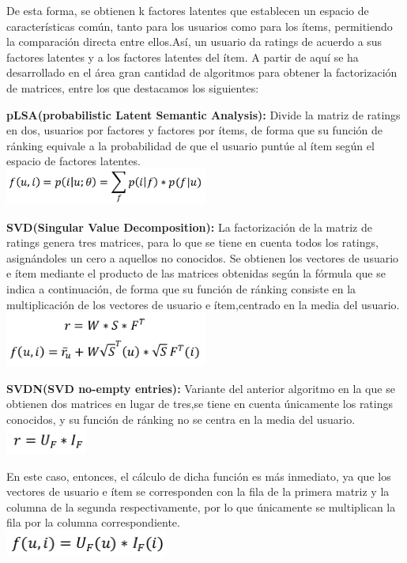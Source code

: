  		De esta forma, se obtienen k factores latentes que establecen un espacio de características común, tanto para los usuarios como para los ítems, permitiendo la comparación directa entre ellos.Así, un usuario da ratings de acuerdo a sus factores latentes y a los factores latentes del ítem.
 		A partir de aquí se ha desarrollado en el área gran cantidad de algoritmos para obtener la factorización de matrices, entre los que destacamos los siguientes:

 		\textbf{pLSA(probabilistic Latent Semantic Analysis):} Divide la matriz de ratings en dos, usuarios por factores y factores por ítems, de forma que su función de ránking equivale a la probabilidad de que el usuario puntúe al ítem según el espacio de factores latentes.\\
 		\includegraphics[width=0.5\textwidth]{images/plsa}

		\textbf{SVD(Singular Value Decomposition):} La factorización de la matriz de ratings genera tres matrices, para lo que se tiene en cuenta todos los ratings, asignándoles un cero a aquellos no conocidos. Se obtienen los vectores de usuario e ítem mediante el producto de las matrices obtenidas según la fórmula que se indica a continuación, de forma que su función de ránking consiste en la multiplicación de los vectores de usuario e ítem,centrado en la media del usuario.\\
		\includegraphics[width=0.5\textwidth]{images/svd}

		\textbf{SVDN(SVD no-empty entries):} Variante del anterior algoritmo en la que se obtienen dos matrices en lugar de tres,se tiene en cuenta únicamente los ratings conocidos, y su función de ránking no se centra en la media del usuario.\\
		\includegraphics[width=0.2\textwidth]{images/svdn1}

		En este caso, entonces, el cálculo de dicha función es más inmediato, ya que los vectores de usuario e ítem se corresponden con la fila de la primera matriz y la columna de la segunda respectivamente, por lo que únicamente se multiplican la fila por la columna correspondiente.\\
		\includegraphics[width=0.4\textwidth]{images/svdn2}

